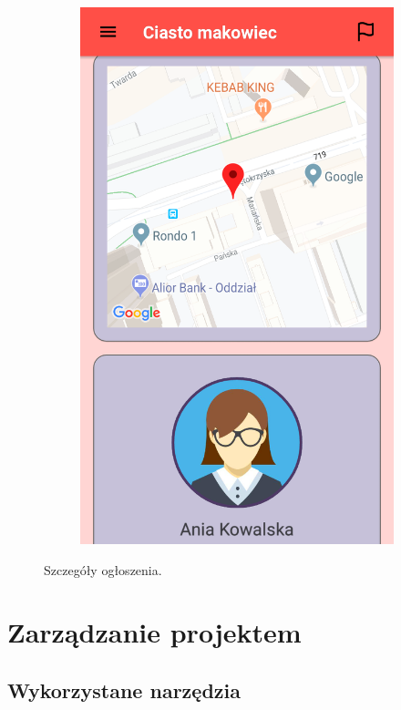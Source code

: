 \documentclass[licencjacka]{pracamgr}
\begin{document}
\begin{figure}[H]
\begin{subfigure}[b]{0.4\linewidth}
\begin{framed}
      \includegraphics[width=\linewidth]{szczegoly2.png}
    \end{framed}
  \end{subfigure}
  \caption{Szczegóły ogłoszenia.}
  \label{fig:offerdetails}
\end{figure}

\chapter{Zarządzanie projektem}\label{r:zarzadzanieProjektem} 
\section{Wykorzystane narzędzia}
\end{document}
